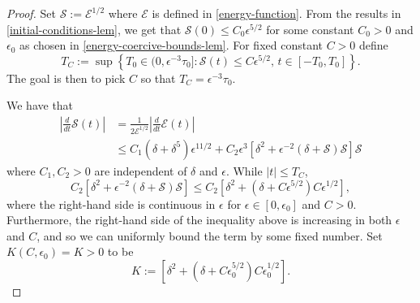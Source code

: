 \begin{proof}
	Set \(\mathcal S := \mathcal E ^{1/2}\) where \(\mathcal E\) is defined in \cref{energy-function}. From the results in \cref{initial-conditions-lem}, we get that \(\mathcal S(0) \leq C_0 \epsilon^{5/2}\) for some constant \(C_0 > 0\) and \(\epsilon_0\) as chosen in \cref{energy-coercive-bounds-lem}. For fixed constant \(C> 0\) define
	\begin{equation*}
		T_{C} := \sup \left\{T_0 \in (0,   \epsilon^{-3} \tau_0]: \mathcal S(t) \leq C \epsilon^{5/2},\, t\in [-T_0, T_0]\right\}.
	\end{equation*} 
	The goal is then to pick \(C\) so that \(T_{C} = \epsilon^{-3} \tau_0\).
	
	We have that
	\begin{equation*}
		\begin{aligned}
			\left | \frac d {dt} \mathcal S(t) \right | &= \frac 1 {2 \mathcal E ^{1/2}} \left | \frac d {dt} \mathcal E(t) \right| \\
			&\leq C_1(\delta + \delta^5) \epsilon^{11/2} + C_2 \epsilon^3\left[ \delta^2 + \epsilon^{-2}(\delta + \mathcal S) \mathcal S \right]\mathcal S
		\end{aligned}
	\end{equation*}
	where \(C_1, C_2 > 0\) are independent of \(\delta\) and \(\epsilon\). While \(|t| \leq T_{C}\),
	\begin{equation*}
		C_2 \left[ \delta^2 + \epsilon^{-2}(\delta + \mathcal S) \mathcal S \right] \leq C_2 \left[ \delta^2  + (\delta +  C\epsilon^{5/2}) C \epsilon^{1/2} \right],
	\end{equation*}
	where the right-hand side is continuous in \(\epsilon \) for \(\epsilon \in [0,\epsilon_0]\) and \(C>0\). Furthermore, the right-hand side of the inequality above is increasing in both \(\epsilon\) and \(C\), and so we can uniformly bound the term by some fixed number. Set \(K(C,\epsilon_0)= K>0\) to be
	\begin{equation*}\label{K-def-2}
		K :=  \left[ \delta^2  + (\delta +  C\epsilon_0^{5/2}) C \epsilon_0^{1/2} \right].
	\end{equation*}
	

\end{proof}

